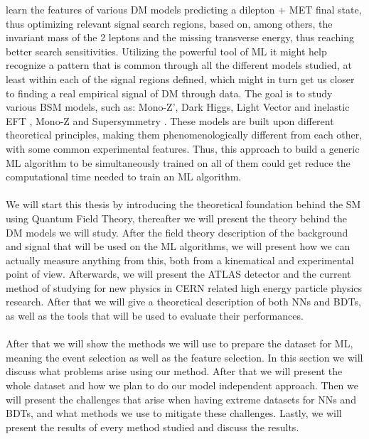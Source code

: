 \documentclass[12pt, a4paper]{book}
\begin{document}
learn the features of various DM models predicting a dilepton + MET final state, thus optimizing relevant signal search regions, based on, among others, the invariant mass of the 2 leptons and the missing transverse energy, thus reaching better search sensitivities. 
Utilizing the powerful tool of ML it might help recognize a pattern that is common through all the different models studied, at least within each of the signal regions defined, which might in turn get us closer to finding a real empirical signal of DM through data. 
The goal is to study various BSM models, such as: Mono-Z', Dark Higgs, Light Vector and inelastic EFT \cite{Zp_DM_candidate2}, Mono-Z \cite{article} and Supersymmetry \cite{JUNGMAN1996195}. 
These models are built upon different theoretical principles, making them phenomenologically different from each other, with some common experimental features. Thus, this approach to build a generic ML algorithm to be simultaneously trained on all of them 
could get reduce the computational time needed to train an ML algorithm.\\
\\We will start this thesis by introducing the theoretical foundation behind the SM using Quantum Field Theory, thereafter we will present the theory behind the  DM models we will study. After the field theory description of the background and signal that will be used 
on the ML algorithms, we will present how we can actually measure anything from this, both from a kinematical and experimental point of view. Afterwards, we will present the ATLAS detector and the current method of studying for new physics in CERN related high energy particle physics research. 
After that we will give a theoretical description of both NNs and BDTs, as well as the tools that will be used to evaluate their performances.\\
\\After that we will show the methods we will use to prepare the dataset for ML, meaning the event selection as well as the feature selection. In this section we will discuss what problems arise using our method. After that we will present the whole dataset and 
how we plan to do our model independent approach. Then we will present the challenges that arise when having extreme datasets for NNs and BDTs, and what methods we use to mitigate these challenges. Lastly, we will present the results of every method studied and discuss the results.
\end{document}
